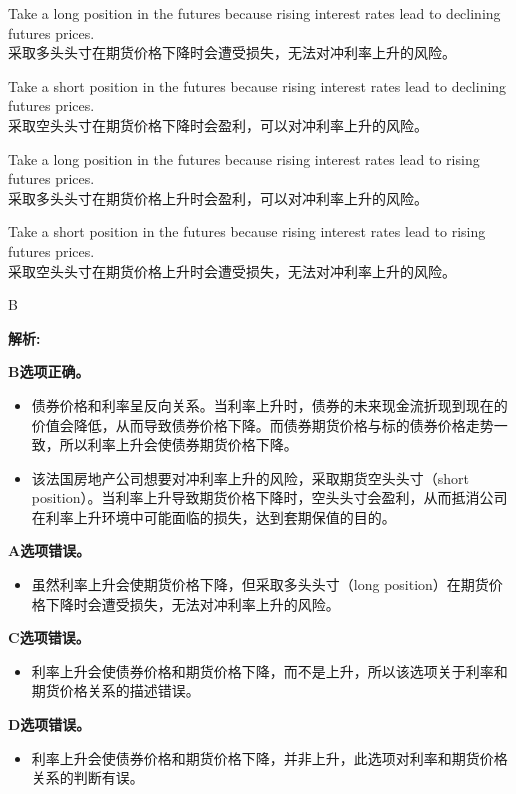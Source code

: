\documentclass{article}
\newenvironment{explanation}
{\textbf{解析:}\par}
{\par}
\begin{document}
    \begin{choices}
        \item Take a long position in the futures because rising interest rates lead to declining futures prices.\\
        采取多头头寸在期货价格下降时会遭受损失，无法对冲利率上升的风险。
        \item Take a short position in the futures because rising interest rates lead to declining futures prices.\\
        采取空头头寸在期货价格下降时会盈利，可以对冲利率上升的风险。
        \item Take a long position in the futures because rising interest rates lead to rising futures prices.\\
        采取多头头寸在期货价格上升时会盈利，可以对冲利率上升的风险。
        \item Take a short position in the futures because rising interest rates lead to rising futures prices.\\
        采取空头头寸在期货价格上升时会遭受损失，无法对冲利率上升的风险。
    \end{choices}
    
    \begin{correctanswer}
        B
    \end{correctanswer}
    
    \begin{explanation}
    \textbf{B选项正确。}
    \begin{itemize}
        \item 债券价格和利率呈反向关系。当利率上升时，债券的未来现金流折现到现在的价值会降低，从而导致债券价格下降。而债券期货价格与标的债券价格走势一致，所以利率上升会使债券期货价格下降。
        \item 该法国房地产公司想要对冲利率上升的风险，采取期货空头头寸（short position）。当利率上升导致期货价格下降时，空头头寸会盈利，从而抵消公司在利率上升环境中可能面临的损失，达到套期保值的目的。
    \end{itemize}
    \textbf{A选项错误。}
    \begin{itemize}
        \item 虽然利率上升会使期货价格下降，但采取多头头寸（long position）在期货价格下降时会遭受损失，无法对冲利率上升的风险。
    \end{itemize}
    \textbf{C选项错误。}
    \begin{itemize}
        \item 利率上升会使债券价格和期货价格下降，而不是上升，所以该选项关于利率和期货价格关系的描述错误。
    \end{itemize}
    \textbf{D选项错误。}
    \begin{itemize}
        \item 利率上升会使债券价格和期货价格下降，并非上升，此选项对利率和期货价格关系的判断有误。
    \end{itemize}
    \end{explanation}
    
\end{document}
